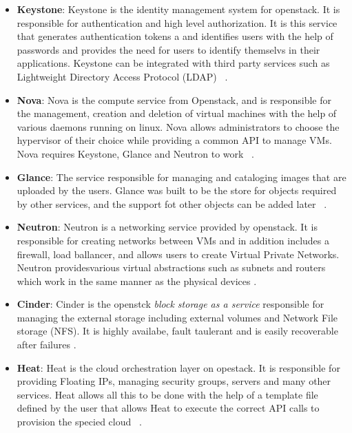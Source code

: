 \begin{itemize}
\item \textbf{Keystone}: Keystone is the identity management system for
openstack. It is responsible for authentication and high level
authorization.  It is this service that generates authentication
tokens a and identifies users with the help of passwords and provides
the need for users to identify themselvs in their
applications. Keystone can be integrated with third party services
such as Lightweight Directory Access Protocol
(LDAP)~\cite{hid-sp18-503-oracle-openstack}
\cite{hid-sp18-503-keystone}.

\item \textbf{Nova}: Nova is the compute service from Openstack, and is
responsible for the management, creation and deletion of virtual
machines with the help of various daemons running on linux.  Nova
allows administrators to choose the hypervisor of their choice while
providing a common API to manage VMs. Nova requires Keystone, Glance
and Neutron to work~\cite{hid-sp18-503-oracle-openstack}
\cite{hid-sp18-503-nova}.

\item \textbf{Glance}: The service responsible for managing and cataloging
images that are uploaded by the users. Glance was built to be the
store for objects required by other services, and the support fot
other objects can be added later~\cite{hid-sp18-503-oracle-openstack}
\cite{hid-sp18-503-glance}.

\item \textbf{Neutron}: Neutron is a networking service provided by openstack.
It is responsible for creating networks between VMs and in addition
includes a firewall, load ballancer, and allows users to
create
Virtual Private Networks.  Neutron providesvarious virtual
abstractions such as subnets and routers which work in the same manner
as the physical devices
\cite{hid-sp18-503-oracle-openstack}
\cite{hid-sp18-503-neutron}.

\item \textbf{Cinder}: Cinder is the openstck \emph{block storage as a service}
responsible for managing the external storage including external
volumes and Network File storage (NFS). It is highly availabe, fault
taulerant and is easily recoverable after failures
\cite{hid-sp18-503-cinder}.

\item \textbf{Heat}: Heat is the cloud orchestration layer on opestack. It
is responsible for providing Floating IPs, managing security groups,
servers and many other services. Heat allows all this to be done with
the help of a template file defined by the user that allows Heat to
execute the correct API calls to provision the specied
cloud~\cite{hid-sp18-503-oracle-openstack}
\cite{hid-sp18-503-heat}.


\end{itemize}

